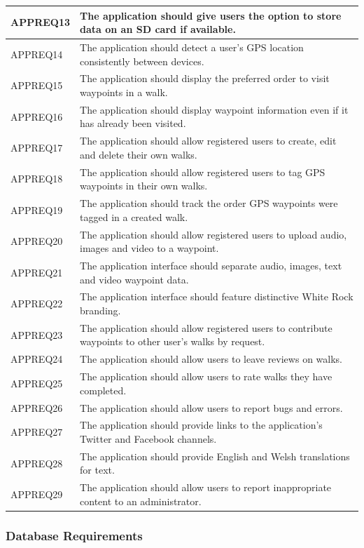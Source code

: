 \documentclass[11pt,a4paper]{article}
\begin{document}
\begin{longtable}{|p{2.5cm}p{13cm}|}
APPREQ13 & The application should give users the option to store data on an SD card if available. \\ \hline
APPREQ14 & The application should detect a user's GPS location consistently between devices. \\ \hline
APPREQ15 & The application should display the preferred order to visit waypoints in a walk. \\ \hline
APPREQ16 & The application should display waypoint information even if it has already been visited. \\ \hline
APPREQ17 & The application should allow registered users to create, edit and delete their own walks. \\ \hline
APPREQ18 & The application should allow registered users to tag GPS waypoints in their own walks. \\ \hline
APPREQ19 & The application should track the order GPS waypoints were tagged in a created walk. \\ \hline
APPREQ20 & The application should allow registered users to upload audio, images and video to a waypoint. \\ \hline
APPREQ21 & The application interface should separate audio, images, text and video waypoint data. \\ \hline
APPREQ22 & The application interface should feature distinctive White Rock branding. \\ \hline
APPREQ23 & The application should allow registered users to contribute waypoints to other user's walks by request. \\ \hline
APPREQ24 & The application should allow users to leave reviews on walks. \\ \hline
APPREQ25 & The application should allow users to rate walks they have completed. \\ \hline
APPREQ26 & The application should allow users to report bugs and errors. \\ \hline
APPREQ27 & The application should provide links to the application's Twitter and Facebook channels. \\ \hline
APPREQ28 & The application should provide English and Welsh translations for text. \\ \hline
APPREQ29 & The application should allow users to report inappropriate content to an administrator. \\ \hline
\end{longtable}

\subsubsection{Database Requirements}
\label{sec:db-reqs}
\end{document}
